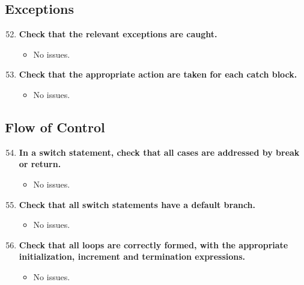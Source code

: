 \documentclass{article}
\begin{document}
		\subsection{Exceptions}
			\begin{enumerate}
				\setcounter{enumi}{51}
				\item \textbf{Check that the relevant exceptions are caught.}
				\begin{itemize}
					\item No issues.
				\end{itemize}
				\item \textbf{Check that the appropriate action are taken for each catch block.}
				\begin{itemize}
					\item No issues.
				\end{itemize}
			\end{enumerate}
		\subsection{Flow of Control}
			\begin{enumerate}
				\setcounter{enumi}{53}
				\item \textbf{In a switch statement, check that all cases are addressed by break or
					return.}
				\begin{itemize}
					\item No issues.
				\end{itemize}
				\item \textbf{Check that all switch statements have a default branch.}
				\begin{itemize}
					\item No issues.
				\end{itemize}
				\item \textbf{Check that all loops are correctly formed, with the appropriate initialization, increment and termination expressions.}
				\begin{itemize}
					\item No issues.
				\end{itemize}
			\end{enumerate}
\end{document}
